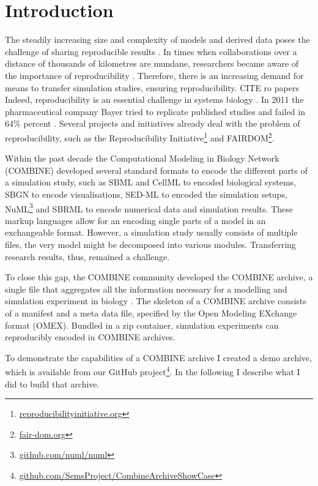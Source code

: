 
\section{Introduction}

The steadily increasing size and complexity of models and derived data poses the challenge of sharing reproducible results \cite{scharm2014}.
In times when collaborations over a distance of thousands of kilometres are mundane, researchers became aware of the importance of reproducibility \cite{Sandve2013}.
Therefore, there is an increasing demand for means to transfer simulation studies, ensuring reproducibility. CITE ro papers
Indeed, reproducibility is an essential challenge in systems biology \cite{Mesirov2010}.
In 2011 the pharmaceutical company Bayer tried to replicate published studies and failed in 64\% percent \cite{Prinz2011}.
Several projects and initiatives already deal with the problem of reproducibility, such as the Reproducibility Initiative\footnote{\href{http://reproducibilityinitiative.org/}{reproducibilityinitiative.org}} and FAIRDOM\footnote{\href{http://fair-dom.org/}{fair-dom.org}}.

Within the past decade the Computational Modeling in Biology Network (COMBINE) developed several standard formats to encode the different parts of a simulation study, such as SBML \cite{Hucka2003} and CellML \cite{Cuellar2003a} to encoded biological systems, SBGN \cite{sbgn} to encode visualisations, SED-ML \cite{Waltemath2011} to encoded the simulation setups, NuML\footnote{\href{https://github.com/numl/numl}{github.com/numl/numl}} and SBRML \cite{Dada2010} to encode numerical data and simulation results.
These markup languages allow for an encoding single parts of a model in an exchangeable format.
However, a simulation study usually consists of multiple files, the very model might be decomposed into various modules.
Transferring research results, thus, remained a challenge.

To close this gap, the COMBINE community developed the COMBINE archive, a single file that aggregates all the information necessary for a modelling and simulation experiment in biology \cite{Bergmann2014}.
The skeleton of a COMBINE archive consists of a manifest and a meta data file, specified by the Open Modeling EXchange format (OMEX).
Bundled in a zip container, simulation experiments can reproducibly encoded in COMBINE archives.

To demonstrate the capabilities of a COMBINE archive I created a demo archive, which is available from our GitHub project\footnote{\href{https://github.com/SemsProject/CombineArchiveShowCase}{github.com/SemsProject/CombineArchiveShowCase}}.
In the following I describe what I did to build that archive.

